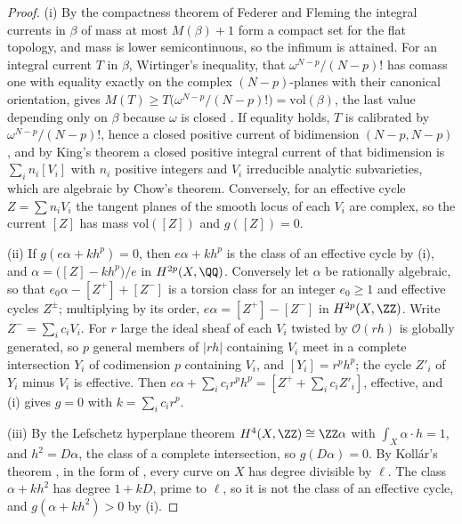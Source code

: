 \begin{proof}
(i) By the compactness theorem of Federer and Fleming \cite{FF60} the integral currents in $\beta$ of mass at most $M(\beta)+1$ form a compact set for the flat topology, and mass is lower semicontinuous, so the infimum is attained. For an integral current $T$ in $\beta$, Wirtinger's inequality, that $\omega^{N-p}/(N-p)!$ has comass one with equality exactly on the complex $(N-p)$-planes with their canonical orientation, gives $M(T)\ge T\bigl(\omega^{N-p}/(N-p)!\bigr)=\mathrm{vol}(\beta)$, the last value depending only on $\beta$ because $\omega$ is closed \cite{HL82}. If equality holds, $T$ is calibrated by $\omega^{N-p}/(N-p)!$, hence a closed positive current of bidimension $(N-p,N-p)$ \cite{HL82}, and by King's theorem \cite{Kin71} a closed positive integral current of that bidimension is $\sum_{i}n_{i}[V_{i}]$ with $n_{i}$ positive integers and $V_{i}$ irreducible analytic subvarieties, which are algebraic by Chow's theorem. Conversely, for an effective cycle $Z=\sum n_{i}V_{i}$ the tangent planes of the smooth locus of each $V_{i}$ are complex, so the current $[Z]$ has mass $\mathrm{vol}([Z])$ and $g([Z])=0$.

(ii) If $g(e\alpha+kh^{p})=0$, then $e\alpha+kh^{p}$ is the class of an effective cycle by (i), and $\alpha=\bigl([Z]-kh^{p}\bigr)/e$ in $H^{2p}(X,\QQ)$. Conversely let $\alpha$ be rationally algebraic, so that $e_{0}\alpha-[Z^{+}]+[Z^{-}]$ is a torsion class for an integer $e_{0}\ge1$ and effective cycles $Z^{\pm}$; multiplying by its order, $e\alpha=[Z^{+}]-[Z^{-}]$ in $H^{2p}(X,\ZZ)$. Write $Z^{-}=\sum_{i}c_{i}V_{i}$. For $r$ large the ideal sheaf of each $V_{i}$ twisted by $\mathcal{O}(rh)$ is globally generated, so $p$ general members of $|rh|$ containing $V_{i}$ meet in a complete intersection $Y_{i}$ of codimension $p$ containing $V_{i}$, and $[Y_{i}]=r^{p}h^{p}$; the cycle $Z'_{i}$ of $Y_{i}$ minus $V_{i}$ is effective. Then $e\alpha+\sum_{i}c_{i}r^{p}h^{p}=[Z^{+}+\sum_{i}c_{i}Z'_{i}]$, effective, and (i) gives $g=0$ with $k=\sum_{i}c_{i}r^{p}$.

(iii) By the Lefschetz hyperplane theorem $H^{4}(X,\ZZ)\cong\ZZ\alpha$ with $\int_{X}\alpha\cdot h=1$, and $h^{2}=D\alpha$, the class of a complete intersection, so $g(D\alpha)=0$. By Koll\'ar's theorem \cite{Kol92}, in the form of \cite[Thm.~2]{SV05}, every curve on $X$ has degree divisible by $\ell$. The class $\alpha+kh^{2}$ has degree $1+kD$, prime to $\ell$, so it is not the class of an effective cycle, and $g(\alpha+kh^{2})>0$ by (i).
\end{proof}

